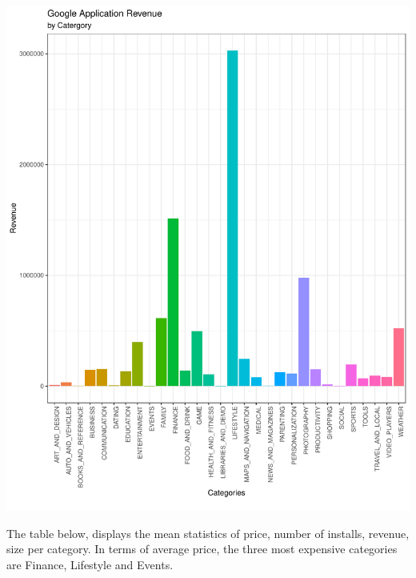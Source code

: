 \documentclass[11pt,preprint, authoryear]{elsarticle}
\numberwithin{equation}{section}
\numberwithin{figure}{section}
\numberwithin{table}{section}
\begin{document}
\includegraphics{Question5_files/figure-latex/unnamed-chunk-1-1.pdf}

\newpage

The table below, displays the mean statistics of price, number of
installs, revenue, size per category. In terms of average price, the
three most expensive categories are Finance, Lifestyle and Events.
\end{document}
